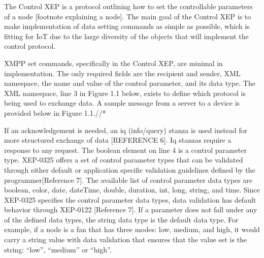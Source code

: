 The Control XEP is a protocol outlining how to set the controllable parameters 
of a node [footnote explaining a node]. The main goal of the Control XEP is 
to make implementation of data setting commands as simple as possible, which is 
fitting for IoT due to the large diversity of the objects that will implement 
the control protocol.

XMPP set commands, specifically in the Control XEP, are minimal in implementation. 
The only required fields are the recipient and sender, XML namespace, the name 
and value of the control parameter, and its data type. The XML namespace, line 
3 in Figure 1.1 below, exists to define which protocol is being used to 
exchange data. A sample message from a server to a device is provided below in 
Figure 1.1.//*



If an acknowledgement is needed, an iq (info/query) stanza is used instead for more structured exchange of data [REFERENCE 6]. Iq stanzas require a response to any request.
The boolean element on line 4 is a control parameter type. XEP-0325 offers a set of control parameter types that can be validated through either default or application specific validation guidelines defined by the programmer[Reference 7]. The available list of control parameter data types are boolean, color, date, dateTime, double, duration, int, long, string, and time. Since XEP-0325 specifies the control parameter data types, data validation has default behavior through XEP-0122 [Reference 7]. If a parameter does not fall under any of the defined data types, the string data type is the default data type. For example, if a node is a fan that has three modes: low, medium, and high, it would carry a string value with data validation that ensures that the value set is the string:  ``low'',  ``medium'' or  ``high''.

